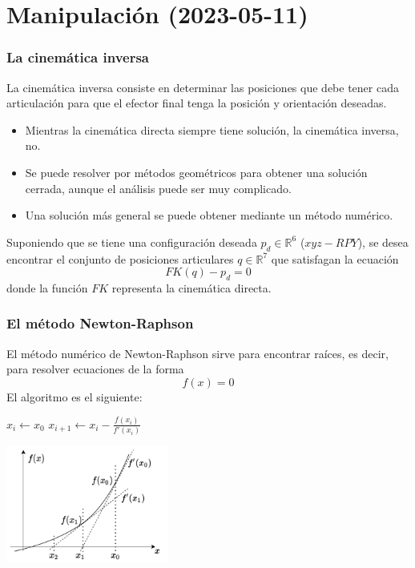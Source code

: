 \section{Manipulación (2023-05-11)}
\begin{frame}\frametitle{La cinemática inversa}
  La cinemática inversa consiste en determinar las posiciones que debe tener cada articulación para que el efector final tenga la posición y orientación deseadas.
  \begin{itemize}
  \item Mientras la cinemática directa siempre tiene solución, la cinemática inversa, no.
  \item Se puede resolver por métodos geométricos para obtener una solución cerrada, aunque el análisis puede ser muy complicado.
  \item Una solución más general se puede obtener mediante un método numérico. 
  \end{itemize}
  Suponiendo que se tiene una configuración deseada $p_d \in \mathbb{R}^6$ ($xyz-RPY$), se desea encontrar el conjunto de posiciones articulares $q\in\mathbb{R}^7$ que satisfagan la ecuación
  \[FK(q) - p_d = 0\]
  donde la función $FK$ representa la cinemática directa. 
\end{frame}

\begin{frame}\frametitle{El método Newton-Raphson}
  El método numérico de Newton-Raphson sirve para encontrar raíces, es decir, para resolver ecuaciones de la forma
  \[f(x) = 0\]
  El algoritmo es el siguiente:
  \[\]
  \begin{multicols}{2}
  \begin{algorithm}[H]
    \DontPrintSemicolon
    $x_i \leftarrow x_0$\;
    {
       $x_{i+1} \leftarrow x_i - \frac{f(x_i)}{f'(x_i)}$
    }
  \end{algorithm}
  \includegraphics[width=0.4\textwidth]{Figures/NewtonRaphson.pdf}
  \end{multicols}
\end{frame}

